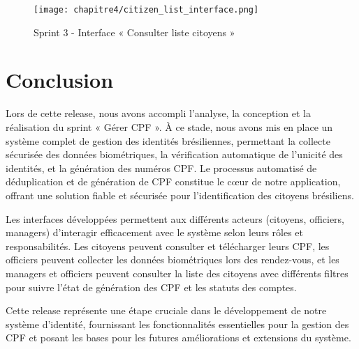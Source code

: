 \begin{figure}[H]
\centering
\texttt{[image: chapitre4/citizen\_list\_interface.png]}
\caption{ Sprint 3 - Interface « Consulter liste citoyens » }
\end{figure}

\section*{Conclusion}
\label{sec_Conclusion:ch4}
Lors de cette release, nous avons accompli l'analyse, la conception et la réalisation du sprint « Gérer CPF ». À ce stade, nous avons mis en place un système complet de gestion des identités brésiliennes, permettant la collecte sécurisée des données biométriques, la vérification automatique de l'unicité des identités, et la génération des numéros CPF. Le processus automatisé de déduplication et de génération de CPF constitue le cœur de notre application, offrant une solution fiable et sécurisée pour l'identification des citoyens brésiliens.

Les interfaces développées permettent aux différents acteurs (citoyens, officiers, managers) d'interagir efficacement avec le système selon leurs rôles et responsabilités. Les citoyens peuvent consulter et télécharger leurs CPF, les officiers peuvent collecter les données biométriques lors des rendez-vous, et les managers et officiers peuvent consulter la liste des citoyens avec différents filtres pour suivre l'état de génération des CPF et les statuts des comptes.

Cette release représente une étape cruciale dans le développement de notre système d'identité, fournissant les fonctionnalités essentielles pour la gestion des CPF et posant les bases pour les futures améliorations et extensions du système.